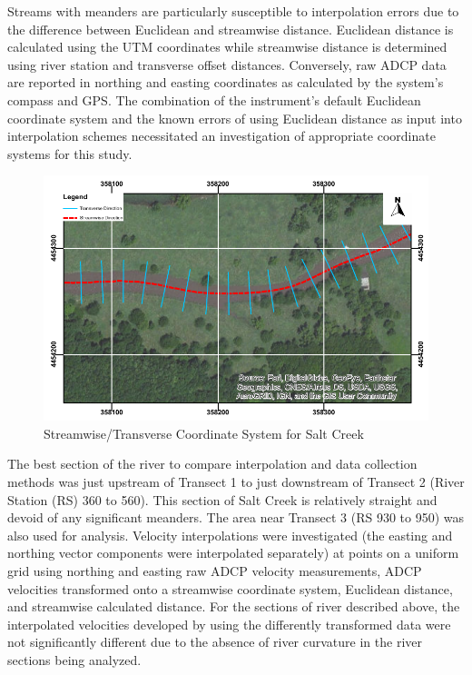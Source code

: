 \documentclass[Journal,letterpaper,BackFigs]{ascelike-new}
\begin{document}
Streams with meanders are particularly susceptible to interpolation errors due to the difference between Euclidean and streamwise distance. Euclidean distance is calculated using the UTM coordinates while streamwise distance is determined using river station and transverse offset distances. Conversely, raw ADCP data are reported in northing and easting coordinates as calculated by the system’s compass and GPS. The combination of the instrument’s default Euclidean coordinate system and the known errors of using Euclidean distance as input into interpolation schemes necessitated an investigation of appropriate coordinate systems for this study.

\begin{figure}
\centering
\includegraphics[width=\textwidth]{StreamCoord.pdf}
\caption{Streamwise/Transverse Coordinate System for Salt Creek}
\label{fig:StreamCoord}
\end{figure}

The best section of the river to compare interpolation and data collection methods was just upstream of Transect 1 to just downstream of Transect 2 (River Station (RS) 360 to 560). This section of Salt Creek is relatively straight and devoid of any significant meanders. The area near Transect 3 (RS 930 to 950) was also used for analysis. Velocity interpolations were investigated (the easting and northing vector components were interpolated separately) at points on a uniform grid using northing and easting raw ADCP velocity measurements, ADCP velocities transformed onto a streamwise coordinate system, Euclidean distance, and streamwise calculated distance. For the sections of river described above, the interpolated velocities developed by using the differently transformed data were not significantly different due to the absence of river curvature in the river sections being analyzed. 
\end{document}
